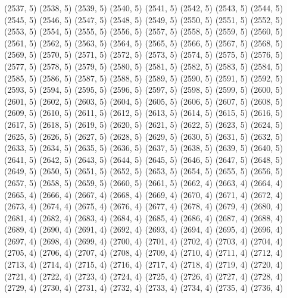 {   (2537, 5)
   (2538, 5)
   (2539, 5)
   (2540, 5)
   (2541, 5)
   (2542, 5)
   (2543, 5)
   (2544, 5)
   (2545, 5)
   (2546, 5)
   (2547, 5)
   (2548, 5)
   (2549, 5)
   (2550, 5)
   (2551, 5)
   (2552, 5)
   (2553, 5)
   (2554, 5)
   (2555, 5)
   (2556, 5)
   (2557, 5)
   (2558, 5)
   (2559, 5)
   (2560, 5)
   (2561, 5)
   (2562, 5)
   (2563, 5)
   (2564, 5)
   (2565, 5)
   (2566, 5)
   (2567, 5)
   (2568, 5)
   (2569, 5)
   (2570, 5)
   (2571, 5)
   (2572, 5)
   (2573, 5)
   (2574, 5)
   (2575, 5)
   (2576, 5)
   (2577, 5)
   (2578, 5)
   (2579, 5)
   (2580, 5)
   (2581, 5)
   (2582, 5)
   (2583, 5)
   (2584, 5)
   (2585, 5)
   (2586, 5)
   (2587, 5)
   (2588, 5)
   (2589, 5)
   (2590, 5)
   (2591, 5)
   (2592, 5)
   (2593, 5)
   (2594, 5)
   (2595, 5)
   (2596, 5)
   (2597, 5)
   (2598, 5)
   (2599, 5)
   (2600, 5)
   (2601, 5)
   (2602, 5)
   (2603, 5)
   (2604, 5)
   (2605, 5)
   (2606, 5)
   (2607, 5)
   (2608, 5)
   (2609, 5)
   (2610, 5)
   (2611, 5)
   (2612, 5)
   (2613, 5)
   (2614, 5)
   (2615, 5)
   (2616, 5)
   (2617, 5)
   (2618, 5)
   (2619, 5)
   (2620, 5)
   (2621, 5)
   (2622, 5)
   (2623, 5)
   (2624, 5)
   (2625, 5)
   (2626, 5)
   (2627, 5)
   (2628, 5)
   (2629, 5)
   (2630, 5)
   (2631, 5)
   (2632, 5)
   (2633, 5)
   (2634, 5)
   (2635, 5)
   (2636, 5)
   (2637, 5)
   (2638, 5)
   (2639, 5)
   (2640, 5)
   (2641, 5)
   (2642, 5)
   (2643, 5)
   (2644, 5)
   (2645, 5)
   (2646, 5)
   (2647, 5)
   (2648, 5)
   (2649, 5)
   (2650, 5)
   (2651, 5)
   (2652, 5)
   (2653, 5)
   (2654, 5)
   (2655, 5)
   (2656, 5)
   (2657, 5)
   (2658, 5)
   (2659, 5)
   (2660, 5)
   (2661, 5)
   (2662, 4)
   (2663, 4)
   (2664, 4)
   (2665, 4)
   (2666, 4)
   (2667, 4)
   (2668, 4)
   (2669, 4)
   (2670, 4)
   (2671, 4)
   (2672, 4)
   (2673, 4)
   (2674, 4)
   (2675, 4)
   (2676, 4)
   (2677, 4)
   (2678, 4)
   (2679, 4)
   (2680, 4)
   (2681, 4)
   (2682, 4)
   (2683, 4)
   (2684, 4)
   (2685, 4)
   (2686, 4)
   (2687, 4)
   (2688, 4)
   (2689, 4)
   (2690, 4)
   (2691, 4)
   (2692, 4)
   (2693, 4)
   (2694, 4)
   (2695, 4)
   (2696, 4)
   (2697, 4)
   (2698, 4)
   (2699, 4)
   (2700, 4)
   (2701, 4)
   (2702, 4)
   (2703, 4)
   (2704, 4)
   (2705, 4)
   (2706, 4)
   (2707, 4)
   (2708, 4)
   (2709, 4)
   (2710, 4)
   (2711, 4)
   (2712, 4)
   (2713, 4)
   (2714, 4)
   (2715, 4)
   (2716, 4)
   (2717, 4)
   (2718, 4)
   (2719, 4)
   (2720, 4)
   (2721, 4)
   (2722, 4)
   (2723, 4)
   (2724, 4)
   (2725, 4)
   (2726, 4)
   (2727, 4)
   (2728, 4)
   (2729, 4)
   (2730, 4)
   (2731, 4)
   (2732, 4)
   (2733, 4)
   (2734, 4)
   (2735, 4)
   (2736, 4)
}
